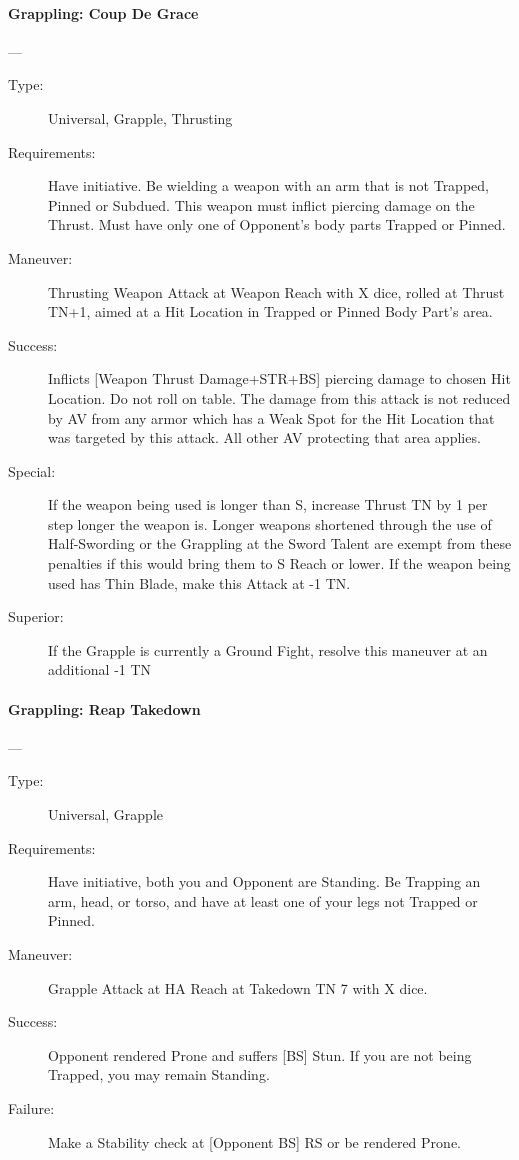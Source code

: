 \paragraph{Grappling: Coup De Grace \large} \label{man:grappling-coup-de-grace}
---\quad {\large [X+2]}
\vspace{-10pt} \begin{description}
\item [Type:] Universal, Grapple, Thrusting
\item [Requirements:] Have initiative. Be wielding a weapon with an arm that is
  not Trapped, Pinned or Subdued. This weapon must inflict piercing damage on
  the Thrust. Must have only one of Opponent’s body parts Trapped or Pinned.  
\item [Maneuver:] Thrusting Weapon Attack at Weapon Reach with X dice, rolled at
  Thrust TN+1, aimed at a Hit Location in Trapped or Pinned Body Part’s area. 
\item [Success:] Inflicts [Weapon Thrust Damage+STR+BS] piercing damage to
  chosen Hit Location. Do not roll on table. The damage from this attack is not
  reduced by AV from any armor which has a Weak Spot for the Hit Location that
  was targeted by this attack. All other AV protecting that area applies. 
\item [Special:] If the weapon being used is longer than S, increase Thrust TN
  by 1 per step longer the weapon is. Longer weapons shortened through the use
  of Half-Swording or the Grappling at the Sword Talent are exempt from these
  penalties if this would bring them to S Reach or lower. If the weapon being
  used has Thin Blade, make this Attack at -1 TN.  
\item [ Superior: ] If the Grapple is currently a Ground Fight, resolve this
  maneuver at an additional -1 TN 
\end{description}

\paragraph{Grappling: Reap Takedown \large} \label{man:grappling-reap-takedown}
---\quad {\large [X]}
\vspace{-10pt} \begin{description}
\item [Type:] Universal, Grapple
\item [Requirements:] Have initiative, both you and Opponent are Standing. Be Trapping
an arm, head, or torso, and have at least one of your legs not Trapped or
Pinned. 
\item [Maneuver:] Grapple Attack at HA Reach at Takedown TN 7 with X dice.
\item [Success:] Opponent rendered Prone and suffers [BS] Stun. If you are not
  being Trapped, you may remain Standing. 
\item [Failure:] Make a Stability check at [Opponent BS] RS or be rendered Prone.  
\end{description}

